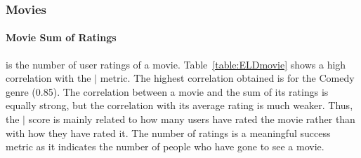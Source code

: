 		\begin{table}[htbp]
			
			\centering
				\caption{Comparison of two midfielders.\label{table:MidfielderComparison}}
			\end{table}
			
			
			\subsubsection{Movies} 
			
			\paragraph{Movie Sum of Ratings} is the number of user ratings of a movie. Table~\ref{table:ELDmovie} shows a high correlation with the $\mid$ metric. The highest correlation obtained is for the Comedy genre (0.85). 
			The correlation between a movie and the sum of its ratings is equally strong, but the correlation with its average rating is much weaker. Thus, the $\mid$ score is mainly related to how many users have rated the movie rather than with how they have rated it. The number of ratings is a meaningful success metric as it indicates the number of people who have gone to see a movie.  
			
